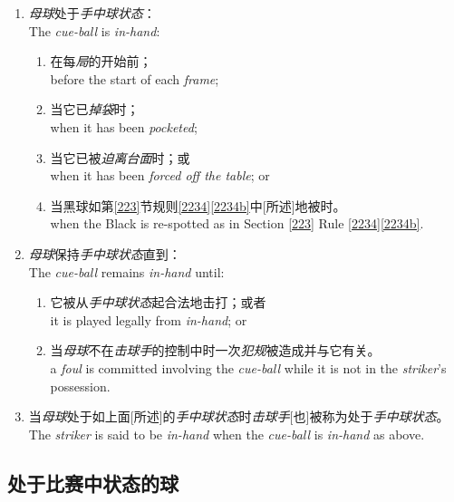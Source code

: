 \begin{enumerate}[label=(\alph*)]
    \item \textit{母球}处于\textit{手中球状态}：\\
    The \textit{cue-ball} is \textit{in-hand}:
    \begin{enumerate}[label=(\roman*)]
        \item 在每\textit{局}的开始前；\\
        before the start of each \textit{frame};
        \item 当它已\textit{掉袋}时；\\
        when it has been \textit{pocketed};
        \item 当它已被\textit{迫离台面}时；或\\
        when it has been \textit{forced off the table}; or
        \item 当黑球如第\ref{223}节规则\ref{2234}\ref{2234b}中[所述]地被\respotted{}时。\\
        when the Black is re-spotted as in Section \ref{223} Rule \ref{2234}\ref{2234b}.
    \end{enumerate}
    \item \textit{母球}保持\textit{手中球状态}直到：\\
    The \textit{cue-ball} remains \textit{in-hand} until:
    \begin{enumerate}[label=(\roman*)]
        \item 它被从\textit{手中球状态}起合法地击打；或者\\
        it is played legally from \textit{in-hand}; or
        \item 当\textit{母球}不在\textit{击球手}的控制中时一次\textit{犯规}被造成并与它有关。\\
        a \textit{foul} is committed involving the \textit{cue-ball} while it is not in the \textit{striker}'s possession.
    \end{enumerate}
    \item 当\textit{母球}处于如上面[所述]的\textit{手中球状态}时\textit{击球手}[也]被称为处于\textit{手中球状态}。\\
    The \textit{striker} is said to be \textit{in-hand} when the \textit{cue-ball} is \textit{in-hand} as above.
\end{enumerate}

\subsection{处于比赛中状态的球}

